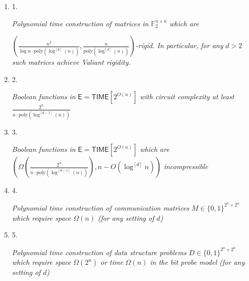 \documentclass[10pt,a4paper]{article}
\begin{document}
\begin{enumerate}


\item[] 
1. 


\emph{Polynomial time construction of matrices in }$\mathbb{F}_{2}^{n\times n}$\emph{ which are }

$(\frac{n^{2}}{\log n\cdot\mathrm{poly}(\log^{[d]}(n))},\frac{n}{\mathrm{poly}(\log^{[d]}(n))})$\emph{-rigid. In particular, for any }$d>2$\emph{ such matrices achieve Valiant rigidity.}\par





\item[] 
2. 


\emph{Boolean functions in }$\mathsf{E}={\mathsf{TIME}}[2^{O(n)}]$\emph{ with circuit complexity at least }$\frac{2^{n}}{n\cdot\mathrm{poly}(\log^{[d-1]}(n))}$\emph{}\par





\item[] 
3. 


\emph{Boolean functions in }$\mathsf{E}={\mathsf{TIME}}[2^{O(n)}]$\emph{ which are }${(\Omega(\frac{2^{n}}{n\cdot\mathrm{poly}(\log^{[d-1]}(n))}),n-O(\log^{[d]}n))}$\emph{ incompressible}\par





\item[] 
4. 


\emph{Polynomial time construction of communication matrices }$M\in\{0,1\}^{2^{n}\times 2^{n}}$\emph{ which require space }$\Omega(n)$\emph{ (for any setting of }$d$\emph{)}\par





\item[] 
5. 


\emph{Polynomial time construction of data structure problems }$D\in\{0,1\}^{2^{n}\times 2^{n}}$\emph{ which require space }$\Omega(2^{n})$\emph{ or time }$\Omega(n)$\emph{ in the bit probe model (for any setting of }$d$\emph{)}\par





\end{enumerate}
\end{document}
